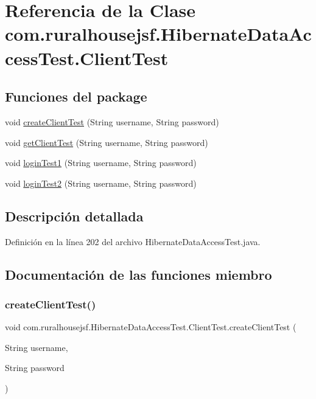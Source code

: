 \hypertarget{a00276}{}\section{Referencia de la Clase com.\+ruralhousejsf.\+Hibernate\+Data\+Access\+Test.\+Client\+Test}
\label{a00276}
\subsection*{Funciones del \textquotesingle{}package\textquotesingle{}}
\begin{DoxyCompactItemize}
\item 
void \mbox{\hyperlink{a00276_aef561536483630370afecf4b1f974c67}{create\+Client\+Test}} (String username, String password)
\item 
void \mbox{\hyperlink{a00276_a32ba702511525559a43deb719637adef}{get\+Client\+Test}} (String username, String password)
\item 
void \mbox{\hyperlink{a00276_a0220519dcf8df8f3b0381d6a3b9bf949}{login\+Test1}} (String username, String password)
\item 
void \mbox{\hyperlink{a00276_a7ff9002a6599de1873e9ec87e7249c3f}{login\+Test2}} (String username, String password)
\end{DoxyCompactItemize}


\subsection{Descripción detallada}


Definición en la línea 202 del archivo Hibernate\+Data\+Access\+Test.\+java.



\subsection{Documentación de las funciones miembro}
\mbox{\label{a00276_aef561536483630370afecf4b1f974c67}} 
\subsubsection{\texorpdfstring{createClientTest()}{createClientTest()}}
{\footnotesize\ttfamily void com.\+ruralhousejsf.\+Hibernate\+Data\+Access\+Test.\+Client\+Test.\+create\+Client\+Test (\begin{DoxyParamCaption}\item[{String}]{username,  }\item[{String}]{password }\end{DoxyParamCaption})\hspace{0.3cm}{\ttfamily [package]}}



